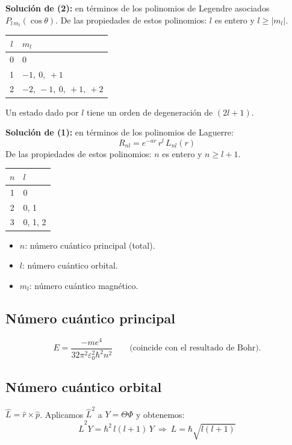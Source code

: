 \documentclass[11pt,a4paper]{article}
\begin{document}
\textbf{Solución de (2):} en términos de los polinomios de Legendre asociados $P_{l\,m_l}(\cos\theta)$. De las propiedades
de estos polinomios: $l$ es entero y $l\ge|m_l|$.

\begin{center}
\begin{tabular}{cl}
\toprule
$l$ & $m_l$\\
\midrule
0 & 0\\
1 & $-1,\ 0,\ +1$\\
2 & $-2,\ -1,\ 0,\ +1,\ +2$\\
\bottomrule
\end{tabular}
\end{center}
Un estado dado por $l$ tiene un orden de degeneración de $(2l+1)$.

\textbf{Solución de (1):} en términos de los polinomios de Laguerre:
\[
R_{nl}=e^{-ar}\,r^l\,L_{nl}(r)
\]
De las propiedades de estos polinomios: $n$ es entero y $n\ge l+1$.

\begin{center}
\begin{tabular}{cl}
\toprule
$n$ & $l$\\
\midrule
1 & 0\\
2 & 0, 1\\
3 & 0, 1, 2\\
\bottomrule
\end{tabular}
\end{center}
\begin{itemize}
  \item $n$: número cuántico principal (total).
  \item $l$: número cuántico orbital.
  \item $m_l$: número cuántico magnético.
\end{itemize}

\subsection{Número cuántico principal}
\[
E=\frac{-me^4}{32\pi^2\varepsilon_0^2\hbar^2n^2}\qquad\text{(coincide con el resultado de Bohr).}
\]

\subsection{Número cuántico orbital}
$\hat L=\hat r\times\hat p$. Aplicamos $\hat L^2$ a $Y=\Theta\Phi$ y obtenemos:
\[
\hat L^2Y=\hbar^2\,l(l+1)\,Y\ \Rightarrow\ \boxed{L=\hbar\sqrt{l(l+1)}}
\]
\end{document}
